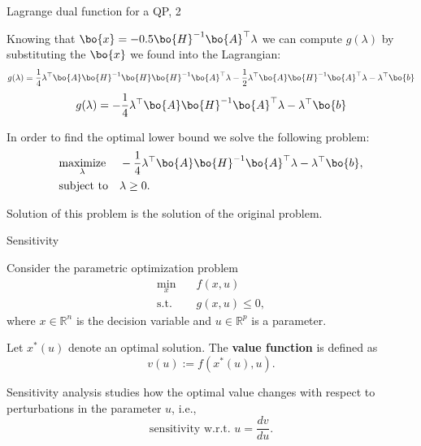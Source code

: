 \documentclass{beamer}
\begin{document}
\begin{frame}{Lagrange dual function for a QP, 2}
	\begin{flushleft}
		
		Knowing that $\bo{x} = -0.5\bo{H}^{-1}\bo{A}^\top \lambda$ we can compute $g(\lambda)$ by substituting the $\bo{x}$ we found into the Lagrangian:
		\begin{equation}
			g(\lambda) = \frac{1}{4} \lambda^\top \bo{A}\bo{H}^{-1}\bo{H}\bo{H}^{-1}\bo{A}^\top\lambda - \frac{1}{2} \lambda^\top \bo{A}\bo{H}^{-1}\bo{A}^\top \lambda - \lambda^\top\bo{b}
		\end{equation}
	\begin{equation}
		g(\lambda) = -\frac{1}{4} \lambda^\top \bo{A}\bo{H}^{-1}\bo{A}^\top\lambda - \lambda^\top\bo{b}
	\end{equation}
		
		In order to find the optimal lower bound we solve the following problem:
		\begin{equation}
			\begin{aligned}
				& \underset{\lambda}{\text{maximize}}
				& & -\frac{1}{4} \lambda^\top \bo{A}\bo{H}^{-1}\bo{A}^\top\lambda - \lambda^\top\bo{b}, \\
				& \text{subject to}
				& & \lambda \geq 0.
			\end{aligned}
		\end{equation}
		
		Solution of this problem is the solution of the original problem.
		
	\end{flushleft}
\end{frame}




\begin{frame}{Sensitivity}
	\begin{flushleft}
		
		Consider the parametric optimization problem
		\begin{equation}
			\begin{aligned}
				\min_{x} \quad & f(x,u) \\
				\text{s.t.} \quad & g(x,u) \leq 0,
			\end{aligned}
		\end{equation}
		where $x \in \mathbb{R}^n$ is the decision variable and $u \in \mathbb{R}^p$ is a parameter.
		
		Let $x^*(u)$ denote an optimal solution. The \textbf{value function} is defined as
		\begin{equation}
			v(u) := f(x^*(u), u).
		\end{equation}
		
		
		Sensitivity analysis studies how the optimal value changes with respect to perturbations in the parameter $u$, i.e.,
		\begin{equation}
			\text{sensitivity w.r.t. } u = \frac{dv}{du}.
		\end{equation}
		
	\end{flushleft}
\end{frame}
\end{document}
